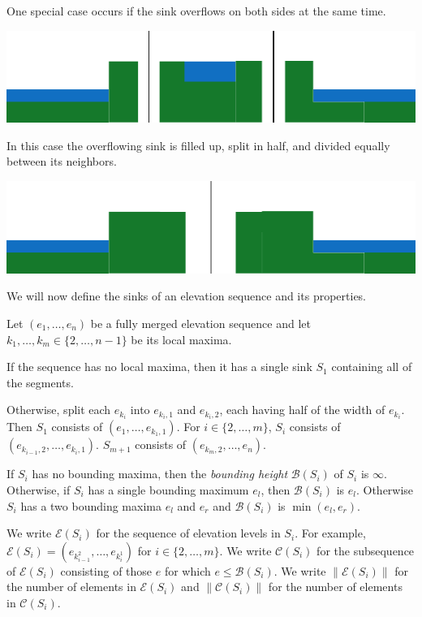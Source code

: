 \documentclass[11pt,a4paper]{article}
\newcommand{\norm}[1]{\left\lVert #1 \right\rVert}
\begin{document}
One special case occurs if the sink overflows on both sides at the same time.
\begin{center}
  \includegraphics{im13.pdf}
\end{center}
In this case the overflowing sink is filled up, split in half, and divided equally between its neighbors.
\begin{center}
  \includegraphics{im14.pdf}
\end{center}

We will now define the sinks of an elevation sequence and its properties.

Let $(e_1,\ldots,e_n)$ be a fully merged elevation sequence and let $k_1,\ldots,k_m \in \{2,\ldots,n-1\}$ be its local maxima.

If the sequence has no local maxima, then it has a single sink $S_1$ containing all of the segments.

Otherwise, split each $e_{k_i}$ into $e_{k_i,1}$ and $e_{k_i,2}$, each having half of the width of $e_{k_i}$.
Then $S_1$ consists of $(e_1,\ldots,e_{k_1,1})$.
For $i\in\{2,\ldots,m\}$, $S_i$ consists of $(e_{k_{i-1},2},\ldots,e_{k_i,1})$.
$S_{m+1}$ consists of $(e_{k_m,2},\ldots,e_n)$.

If $S_i$ has no bounding maxima, then the \textsl{bounding height} $\mathcal{B}(S_i)$ of $S_i$ is $\infty$.
Otherwise, if $S_i$ has a single bounding maximum $e_l$, then $\mathcal{B}(S_i)$ is $e_l$.
Otherwise $S_i$ has a two bounding maxima $e_l$ and $e_r$ and $\mathcal{B}(S_i)$ is $\min(e_l, e_r)$.

We write $\mathcal{E}(S_i)$ for the sequence of elevation levels in $S_i$.
For example, $\mathcal{E}(S_i) = (e_{k_{i-1}^2},\ldots,e_{k_i^1})$ for $i\in\{2,\ldots,m\}$.
We write $\mathcal{C}(S_i)$ for the subsequence of $\mathcal{E}(S_i)$ consisting of those $e$ for which $e \le \mathcal{B}(S_i)$.
We write $\norm{\mathcal{E}(S_i)}$ for the number of elements in $\mathcal{E}(S_i)$ and $\norm{\mathcal{C}(S_i)}$ for the number of elements in $\mathcal{C}(S_i)$.
\end{document}
